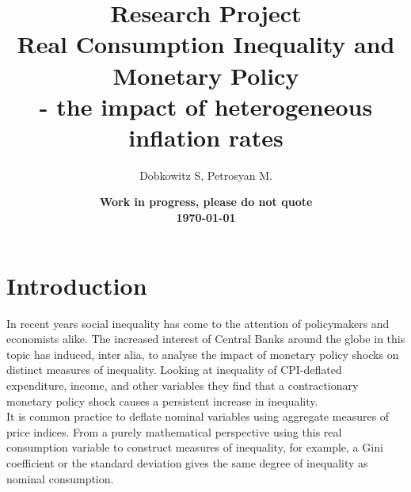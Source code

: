 \documentclass{article}
\title{Research Project\\ Real Consumption Inequality and Monetary Policy \\ - the impact of heterogeneous inflation rates}
\author{Dobkowitz S, Petrosyan M.}
\date{\bf Work in progress, please do not quote\\ \today}
\begin{document}
\maketitle

\thispagestyle{empty}
\tableofcontents
\newpage

\section{Introduction}
In recent years social inequality has come to the attention of policymakers and economists alike. The increased interest of Central Banks around the globe in this topic \cite{mersch} has induced, inter alia, \cite{Coibion2017InnocentInequality}  to analyse the impact of monetary policy shocks on distinct measures of inequality. Looking at inequality of CPI-deflated expenditure, income, and other variables they find that a contractionary monetary policy shock causes a persistent increase in inequality. \\
It is common practice to deflate nominal variables using aggregate measures of price indices. 
From a purely mathematical perspective using this real consumption variable to construct measures of inequality, for example, a Gini coefficient or the standard deviation gives the same degree of inequality as nominal consumption. \\
\end{document}
